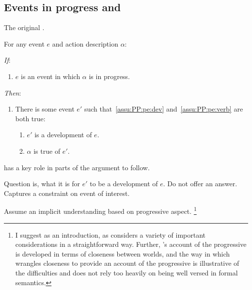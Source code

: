 \subsection{Events in progress and \assuPP{}}

\begin{note}
  \color{red}
  The original \assuPP{}.
\end{note}


\begin{note}
  \begin{assumption}[\assuPP{2}]%
    \label{assu:PP}%
    For any event \(e\) and action description \(\alpha\):
    \begin{itenum}
    \item[\emph{If}:]
      \begin{enumerate}[label=\alph*., ref=(\alph*)]
      \item
        \(e\) is an event in which \(\alpha\) is in progress.
      \end{enumerate}
    \item[\emph{Then}:]
      \begin{enumerate}[label=\alph*., ref=(\alph*), resume]
      \item
        There is some  event \(e'\) such that~\ref{assu:PP:pe:dev} and~\ref{assu:PP:pe:verb} are both true:
        \begin{enumerate}[label=\roman*., ref=(\roman*)]
        \item
          \label{assu:PP:pe:dev}
          \(e'\) is a development of \(e\).
        \item
          \label{assu:PP:pe:verb}
          \(\alpha\) is true of \(e'\).
        \end{enumerate}
      \end{enumerate}
    \end{itenum}
    \vspace{-\baselineskip}
  \end{assumption}

  \assuPP{} has a key role in parts of the argument to follow.

  Question is, what it is for \(e'\) to be a development of \(e\).
  Do not offer an answer.
  Captures a constraint on  event of interest.

  Assume an implicit understanding based on progressive aspect.%
  \footnote{
    \nocite{Portner:1998um}
    \nocite{Engelberg:1999vi}
    I suggest \textcite{Landman:1992wh} as an introduction, as \citeauthor{Landman:1992wh} considers a variety of important considerations in a straightforward way.
    Further, \citeauthor{Landman:1992wh}'s account of the progressive is developed in terms of closeness between worlds, and the way in which \citeauthor{Landman:1992wh} wrangles closeness to provide an account of the progressive is illustrative of the difficulties and does not rely too heavily on being well versed in formal semantics.

}
\end{note}
